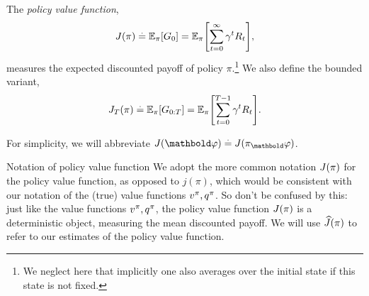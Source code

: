 \begin{defn}
  The \emph{policy value function}, \begin{align}
    \j{\pi} \defeq \E[\pi]{G_0} = \E[\pi]{\sum_{t=0}^\infty \gamma^t R_t},
  \end{align} measures the expected discounted payoff of policy $\pi$.\footnote{We neglect here that implicitly one also averages over the initial state if this state is not fixed.}
  We also define the bounded variant, \begin{align}
    \j{\pi}[T] \defeq \E[\pi]{G_{0:T}} = \E[\pi]{\sum_{t=0}^{T-1} \gamma^t R_t}.
  \end{align}
\end{defn}
For simplicity, we will abbreviate $\j{\vvarphi} \defeq \j{\pi_\vvarphi}$.

\begin{rmk}{Notation of policy value function}{}
  We adopt the more common notation $\j{\pi}$ for the policy value function, as opposed to $j(\pi)$, which would be consistent with our notation of the (true) value functions $\fnv[\pi], \fnq[\pi]$.
  So don't be confused by this: just like the value functions $\fnv[\pi], \fnq[\pi]$, the policy value function $\j{\pi}$ is a deterministic object, measuring the mean discounted payoff.
  We will use $\J{\pi}$ to refer to our estimates of the policy value function.
\end{rmk}

